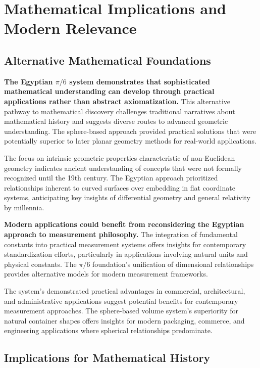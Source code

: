 \documentclass[11pt]{article}
\begin{document}
\section{Mathematical Implications and Modern Relevance}

\subsection{Alternative Mathematical Foundations}

\textbf{The Egyptian $\pi/6$ system demonstrates that sophisticated mathematical understanding can develop through practical applications rather than abstract axiomatization.} This alternative pathway to mathematical discovery challenges traditional narratives about mathematical history and suggests diverse routes to advanced geometric understanding. The sphere-based approach provided practical solutions that were potentially superior to later planar geometry methods for real-world applications.

The focus on intrinsic geometric properties characteristic of non-Euclidean geometry indicates ancient understanding of concepts that were not formally recognized until the 19th century. The Egyptian approach prioritized relationships inherent to curved surfaces over embedding in flat coordinate systems, anticipating key insights of differential geometry and general relativity by millennia.

\textbf{Modern applications could benefit from reconsidering the Egyptian approach to measurement philosophy.} The integration of fundamental constants into practical measurement systems offers insights for contemporary standardization efforts, particularly in applications involving natural units and physical constants. The $\pi/6$ foundation's unification of dimensional relationships provides alternative models for modern measurement frameworks.

The system's demonstrated practical advantages in commercial, architectural, and administrative applications suggest potential benefits for contemporary measurement approaches. The sphere-based volume system's superiority for natural container shapes offers insights for modern packaging, commerce, and engineering applications where spherical relationships predominate.

\subsection{Implications for Mathematical History}
\end{document}

